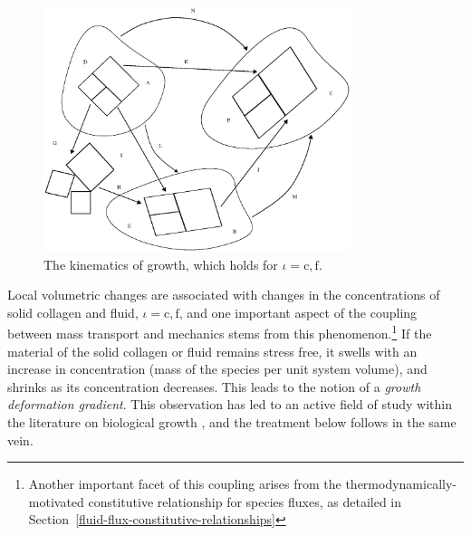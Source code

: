 \begin{figure}[ht]
  \centering
  \includegraphics[width=0.8\textwidth]{images/elucidation/kinematics}
  \caption{The kinematics of growth, which holds for $\iota =
    \mathrm{c,f}$.} 
  \label{continuum-potato-growth-kinematics}
\end{figure}

Local volumetric changes are associated with changes in the
concentrations of solid collagen and fluid, $\iota = \mathrm{c,f}$,
and one important aspect of the coupling between mass transport and
mechanics stems from this phenomenon.\footnote{Another important facet
  of this coupling arises from the thermodynamically-motivated
  constitutive relationship for species fluxes, as detailed in
  Section~\ref{fluid-flux-constitutive-relationships}} If the material
of the solid collagen or fluid remains stress free, it swells with an
increase in concentration (mass of the species per unit system
volume), and shrinks as its concentration decreases. This leads to the
notion of a \emph{growth deformation gradient}.  This observation has
led to an active field of study within the literature on biological
growth \citep{Skalak:81, SkalakHoger:96, Klischetal:2001,
  TaberHumphrey:2001, LubardaHoger:02, AmbrosiMollica:2002}, and the
treatment below follows in the same vein.

